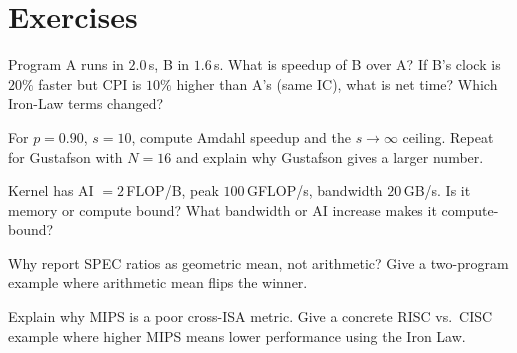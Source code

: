 \section{Exercises}
\begin{exercise}Program A runs in $2.0$\,s, B in $1.6$\,s. What is speedup of B over A? If B's clock is $20\%$ faster but CPI is $10\%$ higher than A's (same IC), what is net time? Which Iron-Law terms changed?\end{exercise}
\begin{exercise}For $p=0.90$, $s=10$, compute Amdahl speedup and the $s\to\infty$ ceiling. Repeat for Gustafson with $N=16$ and explain why Gustafson gives a larger number.\end{exercise}
\begin{exercise}Kernel has AI $=2$\,FLOP/B, peak $100$\,GFLOP/s, bandwidth $20$\,GB/s. Is it memory or compute bound? What bandwidth or AI increase makes it compute-bound?\end{exercise}
\begin{exercise}Why report SPEC ratios as geometric mean, not arithmetic? Give a two-program example where arithmetic mean flips the winner.\end{exercise}
\begin{exercise}Explain why MIPS is a poor cross-ISA metric. Give a concrete RISC vs.\ CISC example where higher MIPS means lower performance using the Iron Law.\end{exercise}

